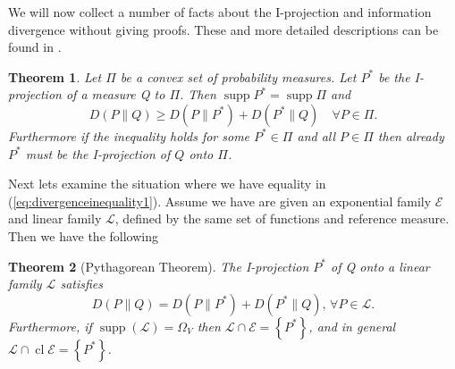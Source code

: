 \documentclass[12pt]{amsart}
\newcommand{\set}[1]{\left\lbrace #1 \right\rbrace} %
\DeclareMathOperator*{\supp}{supp}
\DeclareMathOperator*{\cl}{cl}
\theoremstyle{plain}%
\newtheorem{thm}{Theorem}
\theoremstyle{definition}
\theoremstyle{remark}
\begin{document}
We will now collect a number of facts about the I-projection and
information divergence without giving proofs. These and more detailed
descriptions can be found in \cite{csiszarshields04}.

\begin{thm}
  \label{sec:pythagoreaninequalitytheorem}
  Let $\Pi$ be a convex set of probability measures. Let $P^*$ be the
  I-projection of a measure Q to $\Pi$. Then $\supp P^* = \supp \Pi$
  and
  \begin{equation}
    \label{eq:divergenceinequality1}
    D(P\parallel Q) \geq D(P\parallel P^*) + D(P^*\parallel Q) \quad \forall P \in \Pi.
  \end{equation}
  Furthermore if the inequality holds for some $P^*\in\Pi$ and all
  $P\in\Pi$ then already $P^*$ must be the I-projection of $Q$ onto
  $\Pi$.
\end{thm}

Next lets examine the situation where we have equality in
(\ref{eq:divergenceinequality1}). Assume we have are given an
exponential family $\mathcal{E}$ and linear family $\mathcal{L}$,
defined by the same set of functions and reference measure. Then we
have the following

\begin{thm}[Pythagorean Theorem]
\label{sec:pythagoreantheorem}
The I-projection $P^*$ of Q onto a linear family $\mathcal{L}$
satisfies
  \begin{equation*}
    \label{eq:pythagoreanidentity}
    D(P\parallel Q) = D(P\parallel P^*) + D(P^*\parallel Q), \, \forall P \in \mathcal{L}.
  \end{equation*}
  Furthermore, if $\supp (\mathcal{L})=\Omega_V$ then $\mathcal{L}\cap
  \mathcal{E} = \set{P^*}$, and in general $\mathcal{L}\cap \cl
  \mathcal{E} = \set{P^*}$.
\end{thm}
\end{document}
